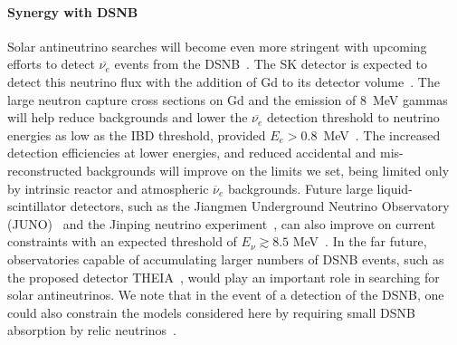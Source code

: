 \documentclass[
reprint,
superscriptaddress,
showpacs,
preprintnumbers,
nofootinbib,
nobibnotes,
amsmath,
amssymb, 
aps,
prd,
floatfix
]{revtex4-1}
\begin{document}
\paragraph{Synergy with DSNB} Solar antineutrino searches will become even more stringent with upcoming efforts to detect $\overline{\nu_e}$ events from the DSNB~\cite{Horiuchi:2008jz,Lunardini:2009ya}. The SK detector is expected to detect this neutrino flux with the addition of Gd to its detector volume~\cite{Beacom:2003nk}. The large neutron capture cross sections on Gd and the emission of $8$~MeV gammas will help reduce backgrounds and lower the $\overline{\nu_e}$ detection threshold to neutrino energies as low as the IBD threshold, provided $E_e > 0.8$~MeV~\cite{Simpson:2019xwo}. The increased detection efficiencies at lower energies, and reduced accidental and mis-reconstructed backgrounds will improve on the limits we set, being limited only by intrinsic reactor and atmospheric $\overline{\nu}_e$ backgrounds. Future large liquid-scintillator detectors, such as the Jiangmen Underground Neutrino Observatory (JUNO)~\cite{An:2015jdp}
and the Jinping neutrino experiment~\cite{JinpingNeutrinoExperimentgroup:2016nol}, can also improve on current constraints with an expected threshold of $E_\nu \gtrsim 8.5$ MeV~\cite{Li:2019snw}.  In the far future, observatories capable of accumulating larger numbers of DSNB events, such as the proposed detector THEIA~\cite{Askins:2019oqj}, would play an important role in searching for solar antineutrinos. We note that in the event of a detection of the DSNB, one could also constrain the models considered here by requiring small DSNB absorption by relic neutrinos~\cite{Jeong:2018yts,Bustamante:2020mep}. 
\end{document}
